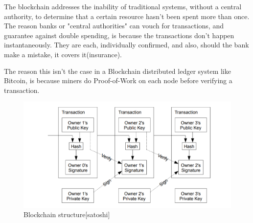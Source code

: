 The blockchain addresses the inability of traditional systems, without a central authority, to determine that a certain resource hasn't been spent more than once. The reason banks or "central authorities" can vouch for transactions, and guarantee against double spending, is because the transactions don't happen instantaneously. They are each, individually confirmed, and also, should the bank make a mistake, it covers it(insurance).\par 
The reason this isn't the case in a Blockchain distributed ledger system like Bitcoin, is because miners do Proof-of-Work on each node before verifying a transaction.
\begin{figure}
\includegraphics[width=6in]{hashes.png}
\caption{Blockchain structure[satoshi]}
\end{figure}

